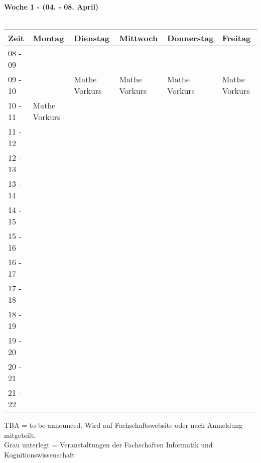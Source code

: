 \textbf{Woche 1 - (04. - 08. April)}\\
\\
\begin{tabular}{|l|p{}|p{}|p{}|p{}|p{}|} 
\hline
Zeit    & Montag        & Dienstag      & Mittwoch      & Donnerstag    & Freitag       \\ 
\hline \hline
08 - 09 & & & & & \\ \cline{1-1} \cline{3-6}
09 - 10 & & \footnotesize{Mathe Vorkurs} & \footnotesize{Mathe Vorkurs} & \footnotesize{Mathe Vorkurs} & \footnotesize{Mathe Vorkurs} \\ \cline{1-2}
10 - 11 & \footnotesize{Mathe Vorkurs} & & & & \\ \cline{1-1}
11 - 12 & & & & & \\ \cline{1-1}
12 - 13 & & & & & \\ \cline{1-1}
13 - 14 & & & & & \\ \cline{1-1}
14 - 15 & & & & & \\ \cline{1-1}
15 - 16 & & & & & \\ \cline{1-6}
16 - 17 & & & & & \\ \cline{1-1}
17 - 18 & & & & & \\ \cline{1-1}
18 - 19 & & & & & \\ \cline{1-1}
19 - 20 & & & & & \\ \cline{1-1}
20 - 21 & & & & & \\ \cline{1-1}
21 - 22 & & & & & \\ \hline
\end{tabular}

{\scriptsize TBA = to be announced. Wird auf Fachschaftswebsite oder nach Anmeldung mitgeteilt.} \\
{\scriptsize Grau unterlegt = Veranstaltungen der Fachschaften Informatik und Kognitionswissenschaft }
\vfil

